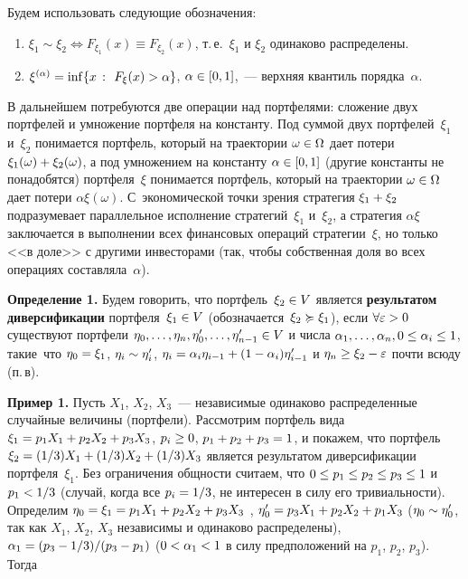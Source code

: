 \begin{multicols}{2}
Будем использовать следующие обозначения:
\begin{enumerate}
\item $\xi_1 \sim \xi_2 \Leftrightarrow F_{\xi_1}(x) \equiv F_{\xi_2}(x)$, т.\,е.\ 
$\xi_1$ и $\xi_2$ одинаково распределены.
\item $\xi^{(\alpha)} = \inf \Set{x}{F_{\xi}(x) \hm> \alpha}$, $\alpha \hm\in [0,1]$,~--- 
верхняя квантиль порядка~$\alpha$.
\end{enumerate}

В дальнейшем потребуются две операции над портфелями: сложение двух
портфелей и умножение портфеля на константу. Под суммой двух
портфелей~$\xi_1$ и~$\xi_2$ понимается портфель, который на
траектории $\omega \hm\in \Omega$ дает потери
$\xi_1(\omega)\hm+\xi_2(\omega)$, а под умножением на константу $\alpha
\hm\in [0,1]$ (другие константы не понадобятся) портфеля~$\xi$
понимается портфель, который на траектории $\omega \hm\in \Omega$ дает
потери $\alpha \xi(\omega)$. С~экономической точки зрения стратегия
$\xi_1\hm+\xi_2$ подразумевает параллельное исполнение стратегий~$\xi_1$ и~$\xi_2$, 
а стратегия $\alpha \xi$ заключается в выполнении
всех финансовых операций стратегии~$\xi$, но только <<в доле>> с
другими инвесторами (так, чтобы собственная доля во всех операциях
составляла~$\alpha$).

\medskip

\noindent
\textbf{Определение 1.} Будем говорить, что портфель~$\xi_2 \hm\in V$ является
\textbf{результатом диверсификации} портфеля~$\xi_1 \hm\in V$
(обозначается~$\xi_2 \succcurlyeq \xi_1$), если $\forall\eps\hm>0$
существуют портфели $\eta_0, \ldots , \eta_n, \eta_0', \ldots,
\eta_{n-1}'\hm \in V$ и числа $\alpha_1, \ldots, \alpha_n, 0 \hm\le
\alpha_i \hm\le 1$, такие~что $\eta_0 \hm= \xi_1$, $\eta_i \hm\sim \eta_i'$,
$\eta_i \hm= \alpha_i \eta_{i-1} \hm+ (1 \hm- \alpha_i)\eta_{i-1}'$ и $\eta_n
\hm\ge \xi_2 \hm- \eps$ почти всюду (п.\,в).

\medskip

\noindent
\textbf{Пример 1.} Пусть $X_1$, $X_2$, $X_3$~--- независимые одинаково
распределенные случайные величины (портфели). Рассмотрим портфель
вида $\xi_1 \hm= p_1 X_1 \hm+ p_2 X_2 \hm+ p_3 X_3$, $p_i \hm\ge 0$,
$p_1\hm+p_2\hm+p_3\hm=1$, и покажем, что портфель $\xi_2 \hm= (1/3)X_1 \hm+
(1/3) X_2 \hm+ (1/3) X_3$ является результатом диверсификации
портфеля~$\xi_1$. Без ограничения общности считаем, что $0 \hm\le p_1
\hm\le p_2 \hm\le p_3 \hm\le 1$ и $p_1 \hm< 1/3$ (случай, когда все $p_i \hm=
1/3$, не интересен в силу его тривиальности). Определим $\eta_0 \hm=
\xi_1 \hm= p_1 X_1 \hm+ p_2 X_2 \hm+ p_3 X_3$ , $\eta_0' \hm= p_3 X_1 \hm+ p_2 X_2
\hm+ p_1 X_3$ ($\eta_0 \hm\sim \eta_0'$, так как $X_1$, $X_2$, $X_3$
независимы и одинаково распределены), $\alpha_1 \hm= (p_3 \hm-
1/3)/(p_3 \hm- p_1)$ ($0 \hm< \alpha_1 \hm< 1$ в силу предположений на
$p_1$, $p_2$, $p_3$). Тогда 


\end{multicols}
